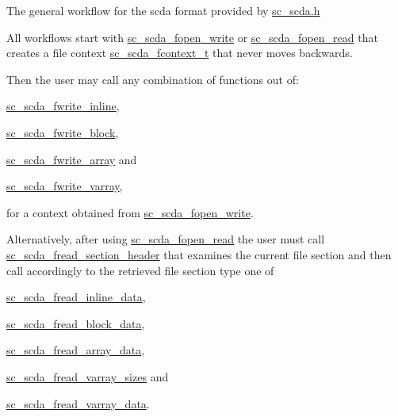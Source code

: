 The general workflow for the scda format provided by \mbox{\hyperlink{sc__scda_8h}{sc\+\_\+scda.\+h}}

All workflows start with \mbox{\hyperlink{sc__scda_8h_a14638ad9e17b15a3e449e4e10fee507c}{sc\+\_\+scda\+\_\+fopen\+\_\+write}} or \mbox{\hyperlink{sc__scda_8h_ac336fd36bcbff9f64fd23f63028b4f89}{sc\+\_\+scda\+\_\+fopen\+\_\+read}} that creates a file context \mbox{\hyperlink{sc__scda_8h_acfad0eccefabd5d5371c69363410bec7}{sc\+\_\+scda\+\_\+fcontext\+\_\+t}} that never moves backwards.

Then the user may call any combination of functions out of\+:


\begin{DoxyItemize}
\item \mbox{\hyperlink{sc__scda_8h_a82eec2df05911d66d8ce1673343862b7}{sc\+\_\+scda\+\_\+fwrite\+\_\+inline}},
\item \mbox{\hyperlink{sc__scda_8h_a1f2290fa5a5f963ab29290ff3fe7d506}{sc\+\_\+scda\+\_\+fwrite\+\_\+block}},
\item \mbox{\hyperlink{sc__scda_8h_ad645fba87e9fac212c635f4c91cecec9}{sc\+\_\+scda\+\_\+fwrite\+\_\+array}} and
\item \mbox{\hyperlink{sc__scda_8h_a82171bb305fc39e606fa02f5948d27b0}{sc\+\_\+scda\+\_\+fwrite\+\_\+varray}},
\end{DoxyItemize}

for a context obtained from \mbox{\hyperlink{sc__scda_8h_a14638ad9e17b15a3e449e4e10fee507c}{sc\+\_\+scda\+\_\+fopen\+\_\+write}}.

Alternatively, after using \mbox{\hyperlink{sc__scda_8h_ac336fd36bcbff9f64fd23f63028b4f89}{sc\+\_\+scda\+\_\+fopen\+\_\+read}} the user must call \mbox{\hyperlink{sc__scda_8h_aa7a7eddf6cf00319260e93bac577aab8}{sc\+\_\+scda\+\_\+fread\+\_\+section\+\_\+header}} that examines the current file section and then call accordingly to the retrieved file section type one of


\begin{DoxyItemize}
\item \mbox{\hyperlink{sc__scda_8h_a0f83f0c77e5a631799421fb77224c384}{sc\+\_\+scda\+\_\+fread\+\_\+inline\+\_\+data}},
\item \mbox{\hyperlink{sc__scda_8h_a171d5c3128d1aeb2c629ec209d154a72}{sc\+\_\+scda\+\_\+fread\+\_\+block\+\_\+data}},
\item \mbox{\hyperlink{sc__scda_8h_a4b347bcb7646f1ee1e7be1156e4ee51f}{sc\+\_\+scda\+\_\+fread\+\_\+array\+\_\+data}},
\item \mbox{\hyperlink{sc__scda_8h_a23a855a2ce1a3dcb18c15ef50f6a909a}{sc\+\_\+scda\+\_\+fread\+\_\+varray\+\_\+sizes}} and
\item \mbox{\hyperlink{sc__scda_8h_a16305c56eb58f12826c276584f888a1a}{sc\+\_\+scda\+\_\+fread\+\_\+varray\+\_\+data}}.
\end{DoxyItemize}

